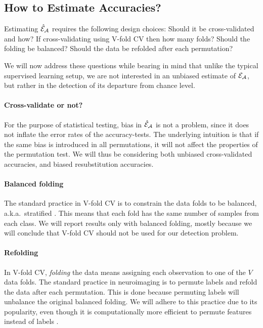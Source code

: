 \documentclass[]{bio}
\begin{document}
\subsection{How to Estimate Accuracies?}
\label{sec:considerations}

Estimating $\hat{\mathcal{E}}_{\mathcal{A}}$ requires the following design choices: 
Should it be cross-validated and how? 
If cross-validating using V-fold CV then how many folds? 
Should the folding be balanced?
Should the data be refolded after each permutation? 

We will now address these questions while bearing in mind that unlike the typical supervised learning setup, we are not interested in an unbiased estimate of $\mathcal{E}_{\mathcal{A}}$, but rather in the detection of its departure from chance level. 

\paragraph{Cross-validate or not?}
For the purpose of statistical testing, bias in $\hat{\mathcal{E}}_{\mathcal{A}}$ is not a problem, since  it does not inflate the error rates of the accuracy-tests. 
The underlying intuition is that if the same bias is introduced in all permutations, it will not affect the properties of the permutation test. 
We will thus be considering both unbiased cross-validated accuracies, and biased resubstitution accuracies.


\paragraph{Balanced folding}
The standard practice in V-fold CV is to constrain the data folds to be balanced, a.k.a.\ stratified \cite[for example]{ojala_permutation_2010}.
This means that each fold has the same number of samples from each class. 
We will report results only with balanced folding, mostly because we will conclude that V-fold CV should not be used for our detection problem. 


\paragraph{Refolding}
In V-fold CV, \emph{folding} the data means assigning each observation to one of the $V$ data folds. 
The standard practice in neuroimaging is to permute labels and refold the data after each permutation. 
This is done because permuting labels will unbalance the original balanced folding.
We will adhere to this practice due to its popularity, even though it is computationally more efficient to permute features instead of labels \citep[e.g.][]{golland_permutation_2005} .
\end{document}
